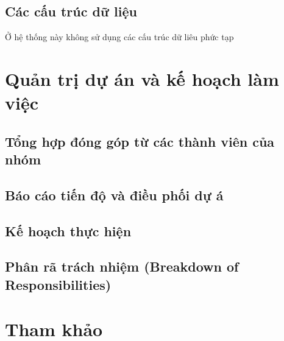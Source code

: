 \documentclass[a4paper, 12pt]{article}
\begin{document}
\subsection{Các cấu trúc dữ liệu}
	Ở hệ thống này không sử dụng các cấu trúc dữ liêu phức tạp


\clearpage

\section{Quản trị dự án và kế hoạch làm việc}

\subsection{Tổng hợp đóng góp từ các thành viên của nhóm}

\subsection{Báo cáo tiến độ và điều phối dự á}

\subsection{Kế hoạch thực hiện}

\subsection{Phân rã trách nhiệm (Breakdown of Responsibilities)}

\clearpage

\section{Tham khảo}
\clearpage
\end{document}
